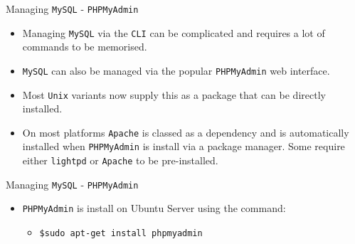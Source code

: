 \documentclass[xcolor=table,aspectratio=169]{beamer}
\begin{document}
\begin{frame}{Managing \texttt{MySQL} - \texttt{PHPMyAdmin}}
  \begin{itemize}
    \item Managing \texttt{MySQL} via the \texttt{CLI} can be complicated and requires a lot of commands to be memorised. 
    \item \texttt{MySQL} can also be managed via the popular \texttt{PHPMyAdmin} web interface.
    \item Most \texttt{Unix} variants now supply this as a package that can be directly installed.
    \item On most platforms \texttt{Apache} is classed as a dependency and is automatically installed when \texttt{PHPMyAdmin} is install via a package manager. Some require either \texttt{lightpd} or \texttt{Apache} to be pre-installed.
  \end{itemize}
\end{frame}

\begin{frame}{Managing \texttt{MySQL} - \texttt{PHPMyAdmin}}
  \begin{itemize}
    \item \texttt{PHPMyAdmin} is install on Ubuntu Server using the command:
      \begin{itemize}
        \item \texttt{\$sudo apt-get install phpmyadmin}
      \end{itemize}
  \end{itemize}
\end{frame}
\end{document}
